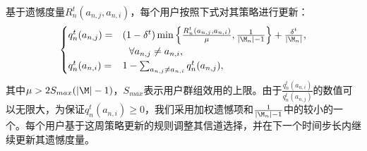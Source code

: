 基于遗憾度量$R_n^t(a_{n,j},a_{n,i})$，每个用户按照下式对其策略进行更新：
\vspace{-0.1cm}
\begin{equation}\label{eq:str2}
\begin{cases}
q^{t}_n(a_{n,j})=&(1-\delta^t)\min\left\{\frac{R^t_n(a_{n,j},a_{n,i})}{\mu},\frac{1}{|\M_n|-1}\right\}+\frac{\delta^t}{|\M_n|},\\ &~~\forall a_{n,j}\neq a_{n,i}, \\
q^{t}_n(a_{n,i})=&1-\sum_{a_{n,j}\neq a_{n,i}}q^t_n(a_{n,j}),
\end{cases}
\end{equation}
其中$\mu>2S_{max}(|\M|-1)$，$S_{max}$表示用户群组效用的上限。由于$\frac{q^t_n(a_{n,i})}{q^t_n(a_{n,j})}$的数值可以无限大，为保证$q^{t}_n(a_{n,i})\geq0$，我们采用加权遗憾项和$\frac{1}{|\M_n|-1}$中的较小的一个。每个用户基于这周策略更新的规则调整其信道选择，并在下一个时间步长内继续更新其遗憾度量。

